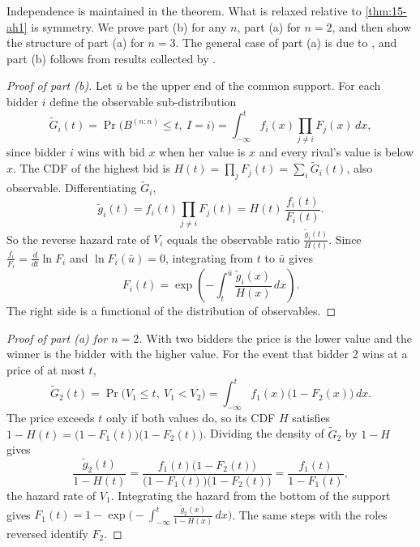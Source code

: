 Independence is maintained in the theorem. What is relaxed relative to \cref{thm:15-ah1} is symmetry. We prove part
(b) for any $n$, part (a) for $n=2$, and then show the structure of part (a) for $n=3$. The general case of part (a)
is due to \citet[Theorem~1 and Section~4]{Meilijson1981}, and part (b) follows from results collected by
\citet[Theorem~7.3.1]{PrakasaRao1992}.

\begin{proof}[Proof of part (b)]
Let $\bar u$ be the upper end of the common support. For each bidder $i$ define the observable sub-distribution
\[
\tilde G_i(t)=\Pr\big(B^{(n:n)}\le t,\ I=i\big)=\int_{-\infty}^t f_i(x)\prod_{j\neq i}F_j(x)\,dx ,
\]
since bidder $i$ wins with bid $x$ when her value is $x$ and every rival's value is below $x$. The CDF of the highest
bid is $H(t)=\prod_jF_j(t)=\sum_i\tilde G_i(t)$, also observable. Differentiating $\tilde G_i$,
\[
\tilde g_i(t)=f_i(t)\prod_{j\neq i}F_j(t)=H(t)\,\frac{f_i(t)}{F_i(t)} .
\]
So the reverse hazard rate of $V_i$ equals the observable ratio $\frac{\tilde g_i(t)}{H(t)}$. Since
$\frac{f_i}{F_i}=\frac{d}{dt}\ln F_i$ and $\ln F_i(\bar u)=0$, integrating from $t$ to $\bar u$ gives
\[
F_i(t)=\exp\left(-\int_t^{\bar u}\frac{\tilde g_i(x)}{H(x)}\,dx\right).
\]
The right side is a functional of the distribution of observables.
\end{proof}

\begin{proof}[Proof of part (a) for $n=2$]
With two bidders the price is the lower value and the winner is the bidder with the higher value. For the event that
bidder 2 wins at a price of at most $t$,
\[
\tilde G_2(t)=\Pr\big(V_1\le t,\ V_1<V_2\big)=\int_{-\infty}^tf_1(x)\big(1-F_2(x)\big)\,dx .
\]
The price exceeds $t$ only if both values do, so its CDF $H$ satisfies $1-H(t)=\big(1-F_1(t)\big)\big(1-F_2(t)\big)$.
Dividing the density of $\tilde G_2$ by $1-H$ gives
\[
\frac{\tilde g_2(t)}{1-H(t)}=\frac{f_1(t)\big(1-F_2(t)\big)}{\big(1-F_1(t)\big)\big(1-F_2(t)\big)}=\frac{f_1(t)}{1-F_1(t)},
\]
the hazard rate of $V_1$. Integrating the hazard from the bottom of the support gives
$F_1(t)=1-\exp\big(-\int_{-\infty}^t\frac{\tilde g_2(x)}{1-H(x)}\,dx\big)$. The same steps with the roles reversed identify
$F_2$.
\end{proof}

